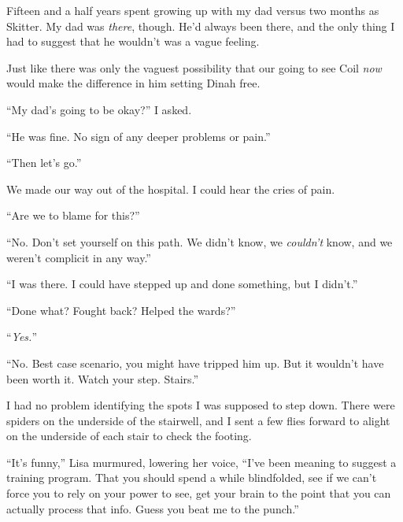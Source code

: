 Fifteen and a half years spent growing up with my dad versus two months as Skitter.  My dad was \emph{there}, though.  He'd always been there, and the only thing I had to suggest that he wouldn't was a vague feeling.



Just like there was only the vaguest possibility that our going to see Coil \emph{now} would make the difference in him setting Dinah free.



``My dad's going to be okay?'' I asked.



``He was fine.  No sign of any deeper problems or pain.''



``Then let's go.''



We made our way out of the hospital.  I could hear the cries of pain.



``Are we to blame for this?''



``No.  Don't set yourself on this path.  We didn't know, we \emph{couldn't} know, and we weren't complicit in any way.''



``I was there.  I could have stepped up and done something, but I didn't.''



``Done what?  Fought back?  Helped the wards?''



``\emph{Yes.}''



``No.  Best case scenario, you might have tripped him up.  But it wouldn't have been worth it.  Watch your step.  Stairs.''



I had no problem identifying the spots I was supposed to step down.  There were spiders on the underside of the stairwell, and I sent a few flies forward to alight on the underside of each stair to check the footing.



``It's funny,'' Lisa murmured, lowering her voice, ``I've been meaning to suggest a training program.  That you should spend a while blindfolded, see if we can't force you to rely on your power to see, get your brain to the point that you can actually process that info.  Guess you beat me to the punch.''



